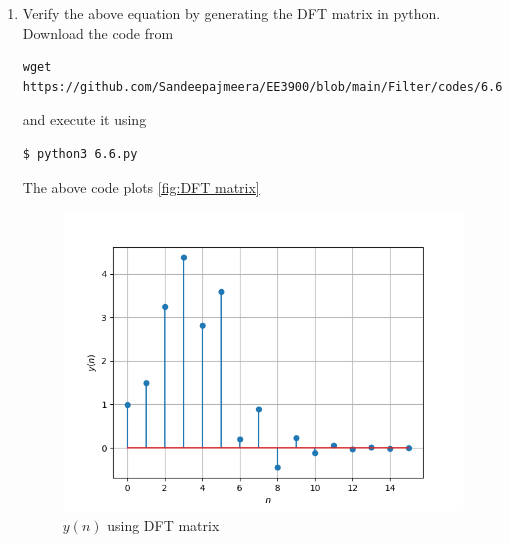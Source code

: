 \documentclass[journal,12pt,twocolumn]{IEEEtran}
\renewcommand\thesection{\arabic{section}}
\begin{document}
\begin{enumerate}[label=\thesection.\arabic*
,ref=\thesection.\theenumi]
\begin{align}
	\mtx{X} = \mtx{W}\mtx{x} = \mtx{x}\mtx{W}
\end{align}
\noindent where
\begin{align}
	\mtx{x} = 
	\begin{pmatrix}
		x(0) \\ x(1) \\ \vdots \\ x(n - 1)
	\end{pmatrix}
\end{align}
\noindent Using \eqref{6.3}, the inverse Fourier Transform is given by
\begin{align}
	\mtx{x} = \mathcal{F}^{-1}\brak{\mtx{X}} = \mtx{W}^{-1}\mtx{X} &= \frac{1}{N}\mtx{W^{H}}\mtx{X} = \frac{1}{N}\mtx{X}\mtx{W^{H}} \\ 
	\implies \mtx{W}^{-1} &= \frac{1}{N}\mtx{W^{H}}
\end{align}
\noindent where $H$ denotes hermitian operator. We can rewrite \eqref{6.2} using the element-wise multiplication operator as
\begin{align}
	\mtx{Y} = \mtx{H}\cdot\mtx{X} = \brak{\mtx{W}\mtx{h}}\cdot\brak{\mtx{W}\mtx{x}}
\end{align}
\item Verify the above equation by generating the DFT matrix in python.\\
\solution Download the code from
\begin{lstlisting}
wget https://github.com/Sandeepajmeera/EE3900/blob/main/Filter/codes/6.6.py
\end{lstlisting}
and execute it using
\begin{lstlisting}
$ python3 6.6.py
\end{lstlisting}

The above code plots \eqref{fig:DFT matrix}
\begin{figure}
\centering
\includegraphics[width=\columnwidth]{figs/6.6.png}
\caption{$y(n)$ using DFT matrix}
\label{fig:DFT matrix}
\end{figure}


\end{enumerate}
\end{document}
